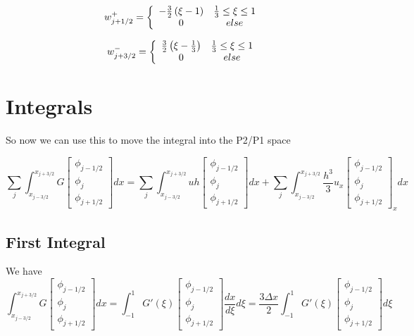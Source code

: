 \documentclass[12pt]{article}
\begin{document}
\[w_{j+1/2}^+ =  \left\lbrace \begin{array}{c c}
-\frac{3}{2}\left(\xi -1\right) & \frac{1}{3} \le \xi \le 1\\
0 & else
\end{array} \right. \]

\[w_{j+3/2}^- =  \left\lbrace \begin{array}{c c}
\frac{3}{2}\left(\xi -\frac{1}{3}\right) & \frac{1}{3} \le \xi \le 1\\
0 & else
\end{array} \right. \]



\section{Integrals}
So now we can use this to move the integral into the P2/P1 space

\[\sum_{j}\int_{x_{j-3/2}}^{x_{j+3/2}}G\left[\begin{array}{c}\phi_{j-1/2} \\\phi_{j}\\\phi_{j+1/2} \end{array}\right]  dx = \sum_{j}\int_{x_{j-3/2}}^{x_{j+3/2}} uh \left[\begin{array}{c}\phi_{j-1/2} \\\phi_{j}\\\phi_{j+1/2} \end{array}\right] dx + \sum_{j}\int_{x_{j-3/2}}^{x_{j+3/2}}\frac{h^3}{3}u_{x}\left[\begin{array}{c}\phi_{j-1/2} \\\phi_{j}\\\phi_{j+1/2} \end{array}\right]_xdx\]


\subsection{First Integral}
We have
\[\int_{x_{j-3/2}}^{x_{j+3/2}}G\left[\begin{array}{c}\phi_{j-1/2} \\\phi_{j}\\\phi_{j+1/2} \end{array}\right]  dx  = \int_{-1}^{1}G'(\xi)\left[\begin{array}{c}\phi_{j-1/2} \\\phi_{j}\\\phi_{j+1/2} \end{array}\right] \frac{dx}{d\xi} d\xi = \frac{3 \Delta x}{2}\int_{-1}^{1}G'(\xi)\left[\begin{array}{c}\phi_{j-1/2} \\\phi_{j}\\\phi_{j+1/2} \end{array}\right] d\xi\]
\end{document}
